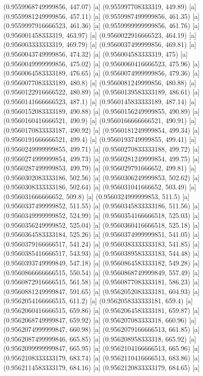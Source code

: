 {{{(0.9559968749999856, 447.07) [a] 
(0.955997708333319, 449.89) [a] 
(0.9559981249999856, 457.11) [a] 
(0.9559987499999856, 461.35) [a] 
(0.9559997916666523, 461.36) [a] 
(0.9559999999999856, 461.76) [a] 
(0.956001458333319, 463.97) [a] 
(0.9560022916666523, 464.19) [a] 
(0.956003333333319, 469.79) [a] 
(0.9560037499999856, 469.81) [a] 
(0.9560043749999856, 474.32) [a] 
(0.956004583333319, 475) [a] 
(0.9560049999999856, 475.02) [a] 
(0.9560060416666523, 475.96) [a] 
(0.9560064583333189, 476.65) [a] 
(0.9560074999999856, 479.36) [a] 
(0.9560077083333189, 480.8) [a] 
(0.9560081249999856, 480.88) [a] 
(0.9560122916666522, 480.89) [a] 
(0.9560139583333189, 486.61) [a] 
(0.9560141666666523, 487.1) [a] 
(0.9560145833333189, 487.14) [a] 
(0.9560152083333189, 490.88) [a] 
(0.9560156249999855, 490.89) [a] 
(0.9560160416666521, 490.9) [a] 
(0.9560166666666521, 490.91) [a] 
(0.9560170833333187, 490.92) [a] 
(0.9560181249999854, 499.34) [a] 
(0.9560191666666521, 499.4) [a] 
(0.9560193749999855, 499.41) [a] 
(0.9560249999999855, 499.71) [a] 
(0.9560270833333188, 499.72) [a] 
(0.9560274999999854, 499.73) [a] 
(0.9560281249999854, 499.75) [a] 
(0.9560287499999853, 499.79) [a] 
(0.956029791666652, 499.81) [a] 
(0.9560302083333186, 502.56) [a] 
(0.9560306249999853, 502.62) [a] 
(0.9560308333333186, 502.64) [a] 
(0.956031041666652, 503.49) [a] 
(0.956031666666652, 509.8) [a] 
(0.9560324999999853, 511.5) [a] 
(0.9560337499999852, 511.55) [a] 
(0.9560345833333186, 511.56) [a] 
(0.9560349999999852, 524.99) [a] 
(0.9560354166666518, 525.03) [a] 
(0.9560356249999852, 525.04) [a] 
(0.9560360416666518, 525.18) [a] 
(0.9560364583333184, 525.26) [a] 
(0.9560374999999851, 541.05) [a] 
(0.9560379166666517, 541.24) [a] 
(0.9560383333333183, 541.85) [a] 
(0.9560385416666517, 543.93) [a] 
(0.9560389583333183, 544.48) [a] 
(0.9560393749999849, 547.18) [a] 
(0.9560864583333182, 549.28) [a] 
(0.9560866666666515, 550.54) [a] 
(0.9560868749999849, 557.49) [a] 
(0.9560872916666515, 561.58) [a] 
(0.9560877083333181, 586.23) [a] 
(0.9560881249999847, 591.65) [a] 
(0.9562052083333181, 604.93) [a] 
(0.9562054166666515, 611.2) [a] 
(0.9562058333333181, 659.4) [a] 
(0.9562060416666515, 659.86) [a] 
(0.9562064583333181, 659.87) [a] 
(0.9562068749999847, 659.92) [a] 
(0.956207083333318, 660.96) [a] 
(0.9562074999999847, 660.98) [a] 
(0.9562079166666513, 661.85) [a] 
(0.9562087499999846, 665.85) [a] 
(0.956208958333318, 665.92) [a] 
(0.9562099999999847, 665.95) [a] 
(0.9562104166666513, 665.96) [a] 
(0.9562108333333179, 683.74) [a] 
(0.9562110416666513, 683.86) [a] 
(0.9562114583333179, 684.16) [a] 
(0.9562120833333179, 684.65) [a] 
}}}
